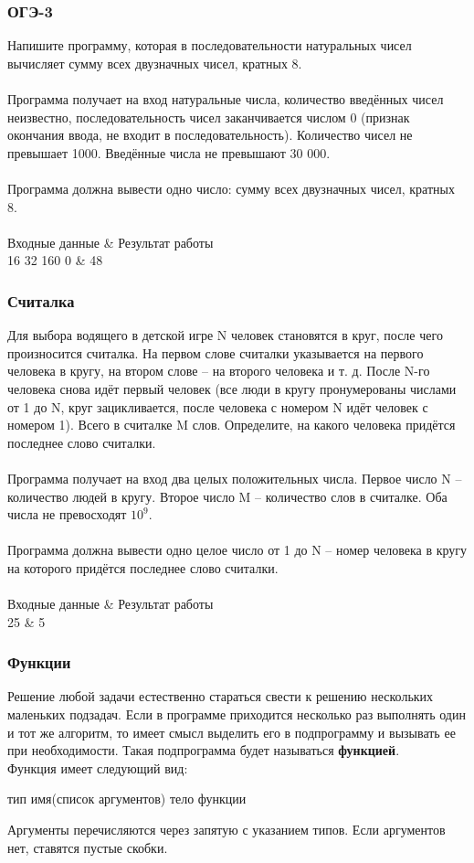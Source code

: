\documentclass[PDF,10pt,usenames,dvipsnames,t,fragile]{beamer}
\newcommand{\inp}{\vspace{4pt}\\ \vspace{4pt}{\bf Входные данные} \\} %
\newcommand{\out}{\vspace{4pt}\\ \vspace{4pt}{\bf Результат работы} \\} %
\newcommand{\tb}{\\ \hline} %
\newenvironment{ex}{\vspace{4pt}\\ \vspace{4pt}{\bf Пример} \\
\tabularx{\textwidth}{|>{\tt}X|>{\tt}X|}
\hline \sf Входные данные & \sf Результат работы \tb}{\endtabularx}
\begin{document}
\begin{frame}
	\frametitle{ОГЭ-3}
	Напишите программу, которая в последовательности натуральных чисел вычисляет
	сумму всех двузначных чисел, кратных 8.
	\inp
	Программа получает на вход натуральные числа, количество введённых чисел
	неизвестно, последовательность чисел заканчивается числом 0 (признак
	окончания ввода, не входит в последовательность). Количество чисел не
	превышает 1000. Введённые числа не превышают 30 000.
	\out
	Программа должна вывести одно число: сумму всех двузначных чисел, кратных 8.
	\begin{ex}
	17 16 32 160 0 & 48 \tb
	\end{ex}
\end{frame}

\begin{frame}
	\frametitle{Считалка}
	Для выбора водящего в детской игре N человек становятся в круг, после чего
	произносится считалка. На первом слове считалки указывается на первого
	человека в кругу, на втором слове -- на второго человека и т. д. После N-го
	человека снова идёт первый человек (все люди в кругу пронумерованы числами от
	1 до N, круг зацикливается, после человека с номером N идёт человек с номером
	1). Всего в считалке M слов. Определите, на какого человека придётся
	последнее слово считалки.
	\inp 
	Программа получает на вход два целых положительных числа. Первое число N –
	количество людей в кругу. Второе число M -- количество слов в считалке. Оба
	числа не превосходят $10^9$.
	\out
	Программа должна вывести одно целое число от 1 до N -- номер человека в кругу
	на которого придётся последнее слово считалки.
	\begin{ex}
	10 25 & 5 \tb
	\end{ex}
\end{frame}

\begin{frame}[fragile]
	\frametitle{Функции}
	Решение любой задачи естественно стараться свести к решению нескольких
	маленьких подзадач. Если в программе приходится несколько раз выполнять один и
	тот же алгоритм, то имеет смысл выделить его в подпрограмму и вызывать ее при
	необходимости. Такая подпрограмма будет называться {\bf функцией}. \\
	
	Функция имеет следующий вид:
	\begin{code}
тип имя(список аргументов)
{
	тело функции
}
	\end{code}

	Аргументы перечисляются через запятую с указанием типов. Если аргументов нет,
	ставятся пустые скобки.
\end{frame}
\end{document}
